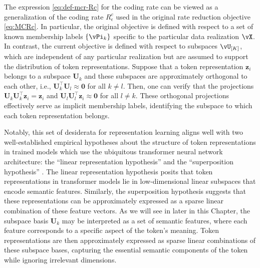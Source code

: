 \documentclass[../../book-main.tex]{subfiles}
\begin{document}
\begin{remark}
    The expression \eqref{eq:def-mcr-Rc} for the coding rate can be
    viewed as a generalization of the coding rate \(R_\epsilon^{c}\)
    used in the original rate reduction objective \eqref{eq:MCRc}. In
    particular, the original objective is defined with respect to a
    set of known membership labels \(\{\vPi_{k}\}\) specific to the
    particular data realization \(\vX\). In contrast, the current
    objective is defined with respect to subspaces \(\vU_{[K]}\),
    which are independent of any particular realization but are
    assumed to support the distribution of token representations.
    Suppose that a token representation $\bm z_i$ belongs to a
    subspace $\bm U_k$ and these subspaces are approximately
    orthogonal to each other, i.e., $\bm U_k^\top \bm U_l \approx \bm
    0$ for all $k \neq l$. Then, one can verify that the projections
    $\bm U_k\bm U_k^\top \bm z_i  = \bm z_i$ and  $\bm U_l\bm
    U_l^\top \bm z_i \approx \bm 0$ for all $l \neq k$. These
    orthogonal projections effectively serve as implicit membership
    labels, identifying the subspace to which each token representation belongs.
\end{remark}

\begin{remark}
    Notably, this set of desiderata for representation learning
    aligns well with two well-established empirical hypotheses about
    the structure of token representations in trained models which
    use the ubiquitous transformer neural network architecture: the
    ``linear representation hypothesis''
    \citep{jiang2024origins,park2023linear} and the ``superposition
    hypothesis'' \citep{elhage2022toy,yun2021transformer}. The linear
    representation hypothesis posits that token representations in
    transformer models lie in low-dimensional linear subspaces that
    encode semantic features. Similarly, the superposition hypothesis
    suggests that these representations can be approximately
    expressed as a sparse linear combination of these feature
    vectors. As we will see in
     later in this
    Chapter, the subspace basis $\bm U_k$ may be interpreted as a set
    of semantic features, where each feature corresponds to a
    specific aspect of the token's meaning. Token representations are
    then approximately expressed as sparse linear combinations of
    these subspace bases, capturing the essential semantic components
    of the token while ignoring irrelevant dimensions.
\end{remark}
\end{document}
